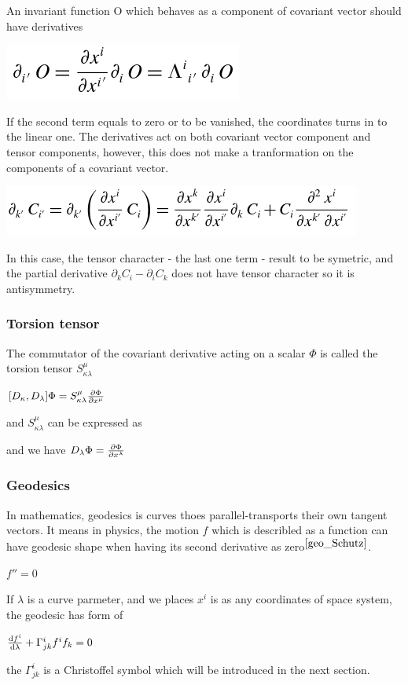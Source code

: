 \documentclass[11pt,a4paper]{article}
\begin{document}
	An invariant function O which behaves as a component of covariant vector should have derivatives
	\begin{center}
		\includegraphics[scale=0.35]{./deriva_O_teno.png}
	\end{center}
	If the second term equals to zero or to be vanished, the coordinates turns in to the linear one. The derivatives act on both covariant vector component and tensor components, however, this does not make a tranformation on the components of a covariant vector.
	\begin{center}
		\includegraphics[scale=0.5]{./driva_cova_vec.png}
	\end{center}
	In this case, the tensor character - the last one term -  result to be symetric, and the partial derivative  $\partial_k C_i - \partial _i C_k$ does not have tensor character so it is antisymmetry.
	\subsubsection{Torsion tensor}
	The commutator of the covariant  derivative acting on  a scalar $\Phi$ is called  the torsion tensor $S^{\mu}_{\kappa \lambda}$ 
	\begin{center}
		$[D_{\kappa}, D_{\lambda}] \Phi = S^{\mu}_{\kappa \lambda} \pdv{\Phi}{x^{\mu}}$
	\end{center}
	and $S^{\mu}_{\kappa \lambda}$ can be expressed as
	\begin{center}
	\end{center}
	and we have $D_{\lambda} \Phi = \pdv{\Phi}{x^{\lambda}}$
	\subsubsection{Geodesics}
	In mathematics, geodesics is curves thoes parallel-transports their own tangent vectors. It means in physics, the motion $f$ which is describled as a function can have geodesic shape when having its second derivative as zero$^{\cite{geo_Schutz}}$.
	\begin{center}
		$f'' = 0$
	\end{center}
	If $\lambda$ is a curve parmeter, and we places ${x^i}$ is as any coordinates of  space system, the geodesic has form of
	\begin{center}
		$\dv{f^i}{\lambda} + \Gamma^i_{jk} f^i f_k = 0$
	\end{center}
	the $\Gamma^i_{jk} $ is a Christoffel symbol which will be introduced in the next section.
\end{document}
